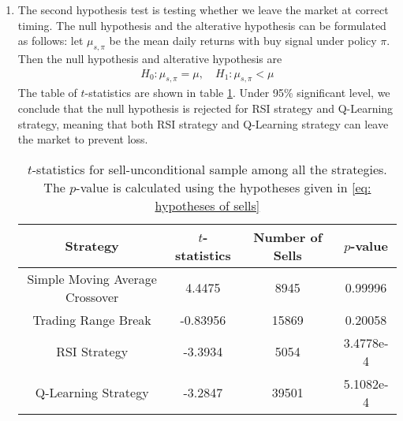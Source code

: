 \documentclass[11pt,a4paper]{article}
\numberwithin{equation}{section}
\begin{document}
\begin{enumerate}
  \item
        The second hypothesis test is testing whether we leave the market at correct timing. The null hypothesis and the alterative hypothesis can be formulated as follows: let $\mu_{s, \pi}$ be the mean daily returns with buy signal under policy $\pi$. Then the null hypothesis and alterative hypothesis are
        \begin{align} \label{eq: hypotheses of sells}
          H_0: \mu_{s, \pi} = \mu, \quad H_1: \mu_{s, \pi} < \mu
        \end{align}
        The table of $t$-statistics are shown in table \ref{table: t-statistics for sell-unconditional sample}. Under 95\% significant level, we conclude that the null hypothesis is rejected for RSI strategy and Q-Learning strategy, meaning that both RSI strategy and Q-Learning strategy can leave the market to prevent loss.
        \begin{table}[]
          \centering
          \begin{tabular}{@{}cccc@{}}
            \toprule
            Strategy                        & $t$-statistics & Number of Sells & $p$-value \\ \midrule
            Simple Moving Average Crossover & 4.4475         & 8945            & 0.99996   \\
            Trading Range Break             & -0.83956       & 15869           & 0.20058   \\
            RSI Strategy                    & -3.3934        & 5054            & 3.4778e-4 \\
            Q-Learning Strategy             & -3.2847        & 39501           & 5.1082e-4 \\ \bottomrule
          \end{tabular}
          \label{table: t-statistics for sell-unconditional sample}
          \caption{$t$-statistics for sell-unconditional sample among all the strategies. The $p$-value is calculated using the hypotheses given in \eqref{eq: hypotheses of sells}}
        \end{table}


\end{enumerate}
\end{document}
